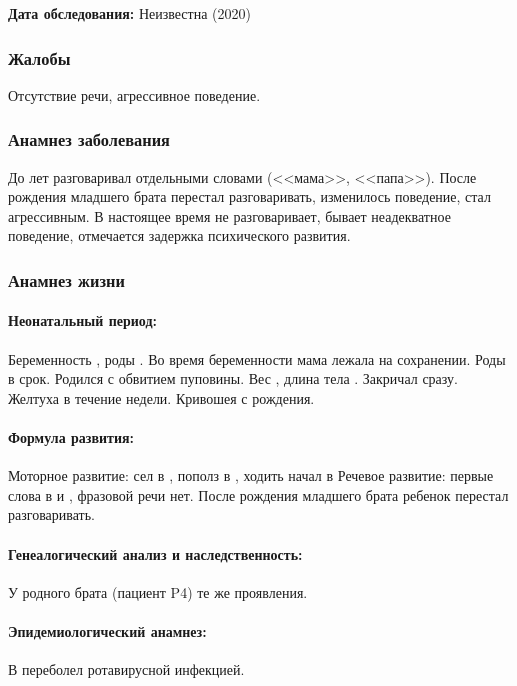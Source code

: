 \documentclass[a4paper,14pt]{extarticle}
\newcommand{\gramm}{г}
\newcommand{\cm}{см}
\newcommand{\months}{мес.}
\begin{document}
\textbf{Дата обследования:} Неизвестна (2020)

\subsubsection*{Жалобы}

Отсутствие речи, агрессивное поведение.

\subsubsection*{Анамнез заболевания}

До  лет разговаривал отдельными словами (<<мама>>, <<папа>>).
После рождения младшего брата перестал разговаривать, изменилось поведение, стал агрессивным. 
В настоящее время не разговаривает, бывает неадекватное поведение, отмечается задержка психического развития.

\subsubsection*{Анамнез жизни}

\paragraph{Неонатальный период:} Беременность , роды .
Во время беременности мама лежала на сохранении. Роды в срок. Родился с обвитием пуповины.
Вес \numprint[\gramm]{3710}, длина тела \numprint[\cm]{54}. Закричал сразу. Желтуха в течение недели. Кривошея с рождения.

\paragraph{Формула развития:} Моторное развитие: сел в \numprint[\months]{9}, пополз в \numprint[\months]{8}, ходить начал в \numprint[\months]{10}
Речевое развитие: первые слова в  и \numprint[\months]{3}, фразовой речи нет. После рождения младшего брата ребенок перестал разговаривать. 

\paragraph{Генеалогический анализ и наследственность:} У родного брата (пациент P4) те же проявления.

\paragraph{Эпидемиологический анамнез:} В \numprint[\months]{5} переболел ротавирусной инфекцией.
\end{document}
